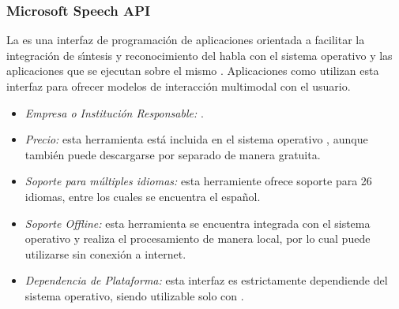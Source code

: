 \subsubsection{Microsoft Speech API}
\label{sec:microsoft}

La  es una interfaz de programaci\'on de aplicaciones orientada a
facilitar la integraci\'on de s{\'\i}ntesis y reconocimiento del habla con el sistema operativo 
y las aplicaciones que se ejecutan sobre el mismo \cite{MicrosoftSpeech}. Aplicaciones como 
utilizan esta interfaz para ofrecer modelos de interacci\'on multimodal con el usuario.

\begin{itemize}
	\item \emph{Empresa o Instituci\'on Responsable:} .
	\item \emph{Precio:} esta herramienta est\'a incluida en el sistema operativo , aunque
	tambi\'en puede descargarse por separado de manera gratuita.
	\item \emph{Soporte para m\'ultiples idiomas:} esta herramiente ofrece soporte para 26 idiomas,
	entre los cuales se encuentra el espa\~nol.
	\item \emph{Soporte Offline:} esta herramienta se encuentra integrada con el sistema operativo
	y realiza el procesamiento de manera local, por lo cual puede utilizarse sin conexi\'on a internet.
	\item \emph{Dependencia de Plataforma:} esta interfaz es estrictamente dependiende del sistema operativo,
	siendo utilizable solo con .
\end{itemize}
